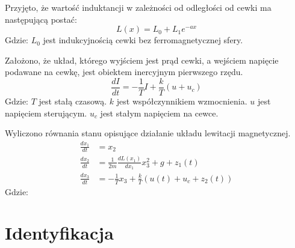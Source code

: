 \documentclass[11pt,a4paper]{article}
\begin{document}
Przyjęto, że wartość induktancji w zależności od odległości od cewki ma następującą postać:
\begin{equation}
L(x)=L_0+L_1e^{-ax}
\end{equation}
\noindent Gdzie:\newline
\(L_0\) jest indukcyjnością cewki bez ferromagnetycznej sfery.

Założono, że układ, którego wyjściem jest prąd cewki, a wejściem napięcie podawane na cewkę, jest obiektem inercyjnym pierwszego rzędu.
\begin{equation}
\frac{dI}{dt}=-\frac{1}{T}I+\frac{k}{T}(u+u_c)
\label{eq:coil_current}
\end{equation}
\noindent Gdzie:\newline
\(T\) jest stałą czasową.\newline
\(k\) jest współczynnikiem wzmocnienia.\newline
\(u\) jest napięciem sterującym.\newline
\(u_c\) jest stałym napięciem na cewce.

Wyliczono równania stanu opisujące działanie układu lewitacji magnetycznej.
\begin{equation}
\begin{aligned}
\frac{dx_1}{dt}&=x_2\\
\frac{dx_2}{dt}&=\frac{1}{2m}\frac{dL(x_1)}{dx_1}x_3^2+g+z_1(t)\\
\frac{dx_3}{dt}&=-\frac{1}{T}x_3+\frac{k}{T}(u(t)+u_c+z_2(t))
\end{aligned}
\label{eq:ss}
\end{equation}
\noindent Gdzie:\newline


\section{Identyfikacja}
\label{sec:identyfikacja}
\end{document}

